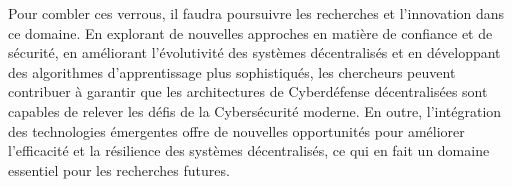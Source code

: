 







Pour combler ces verrous, il faudra poursuivre les recherches et l'innovation dans ce domaine. En explorant de nouvelles approches en matière de confiance et de sécurité, en améliorant l'évolutivité des systèmes décentralisés et en développant des algorithmes d'apprentissage plus sophistiqués, les chercheurs peuvent contribuer à garantir que les architectures de Cyberdéfense décentralisées sont capables de relever les défis de la Cybersécurité moderne. En outre, l'intégration des technologies émergentes offre de nouvelles opportunités pour améliorer l'efficacité et la résilience des systèmes décentralisés, ce qui en fait un domaine essentiel pour les recherches futures.



